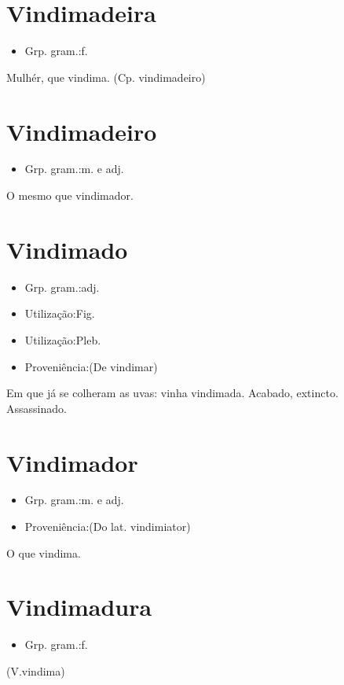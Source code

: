 \documentclass{article}
\begin{document}
\section{Vindimadeira}
\begin{itemize}
\item {Grp. gram.:f.}
\end{itemize}
Mulhér, que vindima.
(Cp. \textunderscore vindimadeiro\textunderscore )
\section{Vindimadeiro}
\begin{itemize}
\item {Grp. gram.:m.  e  adj.}
\end{itemize}
O mesmo que \textunderscore vindimador\textunderscore .
\section{Vindimado}
\begin{itemize}
\item {Grp. gram.:adj.}
\end{itemize}
\begin{itemize}
\item {Utilização:Fig.}
\end{itemize}
\begin{itemize}
\item {Utilização:Pleb.}
\end{itemize}
\begin{itemize}
\item {Proveniência:(De \textunderscore vindimar\textunderscore )}
\end{itemize}
Em que já se colheram as uvas: \textunderscore vinha vindimada\textunderscore .
Acabado, extincto.
Assassinado.
\section{Vindimador}
\begin{itemize}
\item {Grp. gram.:m.  e  adj.}
\end{itemize}
\begin{itemize}
\item {Proveniência:(Do lat. \textunderscore vindimiator\textunderscore )}
\end{itemize}
O que vindima.
\section{Vindimadura}
\begin{itemize}
\item {Grp. gram.:f.}
\end{itemize}
(V.vindima)
\end{document}
